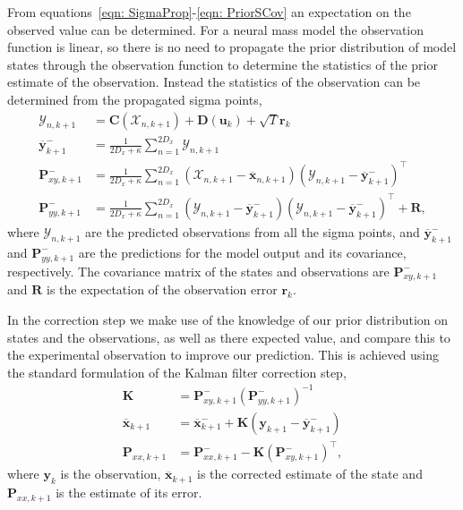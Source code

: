 From equations~\ref{eqn: SigmaProp}-\ref{eqn: PriorSCov} an expectation on the observed value can be determined. For a neural mass model the observation function is linear, so there is no need to propagate the prior distribution of model states through the observation function to determine the statistics of the prior estimate of the observation. Instead the statistics of the observation can be determined from the propagated sigma points,
\begin{align}
\mathbf{\mathcal{Y}}_{n,k+1} &= \mathbf{C}(\mathbf{\mathcal{X}}_{n,k+1})+ \mathbf{D}(\mathbf{u}_{k})+ \sqrt{T}\mathbf{r}_{k}\\
\overline{\mathbf{y}}_{k+1}^{-} &= \frac{1}{2D_{x}+\kappa}\sum_{n=1}^{2D_{x}} \mathbf{\mathcal{Y}}_{n,k+1}\\
\label{eqn: statecovg}
\mathbf{P}_{xy,k+1}^{-} &= \frac{1}{2D_{x}+\kappa}\sum_{n=1}^{2D_{x}} (\mathbf{\mathcal{X}}_{n,k+1}-\overline{\mathbf{x}}_{n,k+1}) (\mathbf{\mathcal{Y}}_{n,k+1}-\overline{\mathbf{y}}_{k+1}^{-})^{\top}\\
\mathbf{P}_{yy,k+1}^{-} &= \frac{1}{2D_{x}+\kappa}\sum_{n=1}^{2D_{x}} (\mathbf{\mathcal{Y}}_{n,k+1}-\overline{\mathbf{y}}_{k+1}^{-}) (\mathbf{\mathcal{Y}}_{n,k+1}-\overline{\mathbf{y}}_{k+1}^{-})^{\top} +\mathbf{R},%
\end{align} where $\mathbf{\mathcal{Y}}_{n,k+1}$ are the predicted observations from all the sigma points, and $\overline{\mathbf{y}}_{k+1}^{-}$ and $\mathbf{P}_{yy,k+1}^{-}$ are the predictions for the model output and its covariance, respectively. The covariance matrix of the states and observations are $\mathbf{P}_{xy,k+1}^{-}$ and $\mathbf{R}$ is the expectation of the observation error $\mathbf{r}_{k}$.

In the correction step we make use of the knowledge of our prior distribution on states and the observations, as well as there expected value, and compare this to the experimental observation to improve our prediction. This is achieved using the standard formulation of the Kalman filter correction step,
\begin{align}
\mathbf{K} &= \mathbf{P}_{xy,k+1}^{-}(\mathbf{P}_{yy,k+1}^{-})^{-1}\\
\overline{\mathbf{x}}_{k+1} &= \overline{\mathbf{x}}_{k+1}^{-} + \mathbf{K}(\mathbf{y}_{k+1}-\overline{\mathbf{y}}_{k+1}^{-})\\
\mathbf{P}_{xx,k+1} &= \mathbf{P}_{xx,k+1}^{-} - \mathbf{K}(\mathbf{P}_{xy,k+1}^{-})^{\top},
\end{align} where $\mathbf{y}_{k}$ is the observation, $\overline{\mathbf{x}}_{k+1}$ is the corrected estimate of the state and $\mathbf{P}_{xx,k+1}$ is the estimate of its error.

